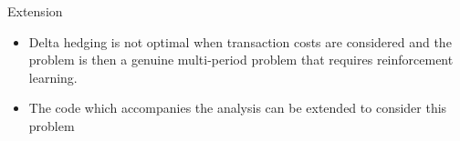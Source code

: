 \documentclass[11pt]{beamer}
\begin{document}
\begin{frame}{Extension}
	\begin{itemize}
		\item Delta hedging is not optimal when transaction costs are considered and the problem is then a genuine multi-period problem that requires reinforcement learning.
		\item The code which accompanies the analysis can be extended to consider this problem
	\end{itemize}
\end{frame}
\end{document}
